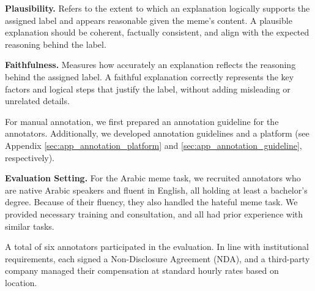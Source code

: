 \noindent
\textbf{Plausibility.} Refers to the extent to which an explanation logically supports the assigned label and appears reasonable given the meme's content. A plausible explanation should be coherent, factually consistent, and align with the expected reasoning behind the label.

\noindent
\textbf{Faithfulness.} Measures how accurately an explanation reflects the reasoning behind the assigned label. A faithful explanation correctly represents the key factors and logical steps that justify the label, without adding misleading or unrelated details. 

For manual annotation, we first prepared an annotation guideline for the annotators. Additionally, we developed annotation guidelines and a platform (see Appendix \ref{sec:app_annotation_platform} and \ref{sec:app_annotation_guideline}, respectively).


\noindent\textbf{Evaluation Setting.} 
%
%
For the Arabic meme task, we recruited annotators who are native Arabic speakers and fluent in English, all holding at least a bachelor's degree. Because of their fluency, they also handled the hateful meme task. We provided necessary training and consultation, and all had prior experience with similar tasks.

A total of six annotators participated in the evaluation. In line with institutional requirements, each signed a Non-Disclosure Agreement (NDA), and a third-party company managed their compensation at standard hourly rates based on location.




